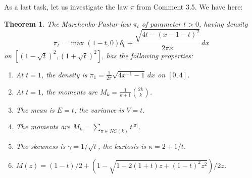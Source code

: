 \documentclass[12pt]{amsbook}
\newtheorem{theorem}{Theorem}[chapter]
\begin{document}
As a last task, let us investigate the law $\pi$ from Comment 3.5. We have here:


\begin{theorem}
The Marchenko-Pastur law $\pi_t$ of parameter $t>0$, having density
$$\pi_t=\max(1-t,0)\delta_0+\frac{\sqrt{4t-(x-1-t)^2}}{2\pi x}\,dx$$
on $[(1-\sqrt{t})^2,(1+\sqrt{t})^2]$, has the following properties:
\begin{enumerate}
\item At $t=1$, the density is $\pi_1=\frac{1}{2\pi}\sqrt{4x^{-1}-1}\,dx$ on $[0,4]$.

\item At $t=1$, the moments are $M_k=\frac{1}{k+1}\binom{2k}{k}$.

\item The mean is $E=t$, the variance is $V=t$.

\item The moments are $M_k=\sum_{\pi\in NC(k)}t^{|\pi|}$.

\item The skewness is $\gamma=1/\sqrt{t}$, the kurtosis is $\kappa=2+1/t$.

\item $M(z)=(1-t)/2+(1-\sqrt{1-2(1+t)z+(1-t)^2z^2})/2z$.
\end{enumerate}
\end{theorem}
\end{document}
